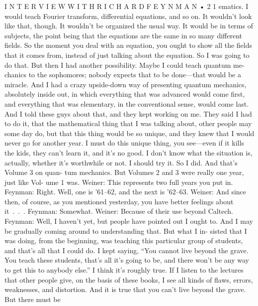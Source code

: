 \documentclass[10pt,oneside]{article}
\begin{document}
I N T E R V I E W  W I T H  R I C H A R D  F E Y N M A N • 2 1 ematics. I would teach Fourier transform, differential equations, and so on. It wouldn’t look like that, though. It wouldn’t be organized the usual way. It would be in terms of subjects, the point being that the equations are the same in so many different fields. So the moment you deal with an equation, you ought to show all the fields that it comes from, instead of just talking about the equation. So I was going to do that. But then I had another possibility. Maybe I could teach quantum me- chanics to the sophomores; nobody expects that to be done---that would be a miracle. And I had a crazy upside-down way of presenting quantum mechanics, absolutely inside out, in which everything that was advanced would come first, and everything that was elementary, in the conventional sense, would come last. And I told these guys about that, and they kept working on me. They said I had to do it, that the mathematical thing that I was talking about, other people may some day do, but that this thing would be so unique, and they knew that I would never go for another year. I must do this unique thing, you see---even if it kills the kids, they can’t learn it, and it’s no good. I don’t know what the situation is, actually, whether it’s worthwhile or not. I should try it. So I did. And that’s Volume 3 on quan- tum mechanics. But Volumes 2 and 3 were really one year, just like Vol- ume 1 was. Weiner: This represents two full years you put in. Feynman: Right. Well, one is ’61–62, and the next is ’62–63. Weiner: And since then, of course, as you mentioned yesterday, you have better feelings about it . . . Feynman: Somewhat. Weiner: Because of their use beyond Caltech. Feynman: Well, I haven’t yet, but people have pointed out I ought to. And I may be gradually coming around to understanding that. But what I in- sisted that I was doing, from the beginning, was teaching this particular group of students, and that’s all that I could do. I kept saying, “You cannot live beyond the grave. You teach these students, that’s all it’s going to be, and there won’t be any way to get this to anybody else.” I think it’s roughly true. If I listen to the lectures that other people give, on the basis of these books, I see all kinds of flaws, errors, weaknesses, and distortion. And it is true that you can’t live beyond the grave. But there must be\par
\end{document}

